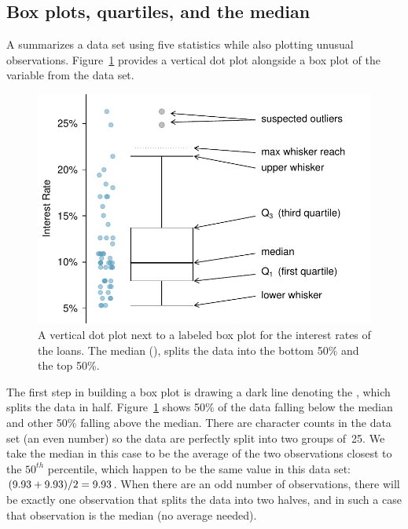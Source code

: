\subsection{Box plots, quartiles, and the median}

A  summarizes a data set using five
statistics while also plotting unusual observations.
Figure~\ref{loan_int_rate_box_plot_layout} provides
a vertical dot plot alongside a box plot of the
 variable from
the  data set.

\begin{figure}[h]
   \centering
   \includegraphics[width=0.86\mycaptionwidth]{ch_summarizing_data/figures/loan_int_rate_box_plot_layout/loan_int_rate_box_plot_layout}
   \caption{A vertical dot plot next to a labeled box plot
       for the interest rates of the \loanN{} loans.
       The median (\loanMedian{}), splits the data into the
       bottom 50\% and the top 50\%.}
   \label{loan_int_rate_box_plot_layout}
\end{figure}

The first step in building a box plot is drawing a dark line
denoting the , which splits the data in half.
Figure~\ref{loan_int_rate_box_plot_layout} shows 50\% of the
data falling below the median and other 50\% falling above
the median.
There are \loanN{} character counts in the data set
(an even number) so the data are perfectly split into two
groups of~25.
We take the median in this case to be the average of the
two observations closest to the $50^{th}$ percentile,
which happen to be the same value in this data set:
$(\text{9.93{}} + \text{9.93{}}) / 2
  = \text{9.93{}}$.
When there are an odd number of observations,
there will be exactly one observation that splits the data
into two halves, and in such a case that observation
is the median (no average needed).


